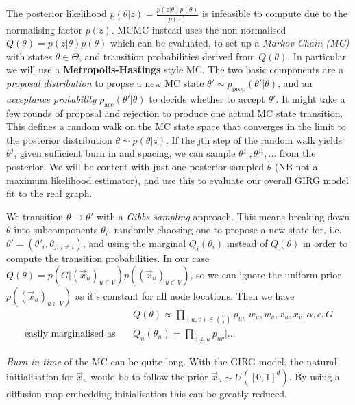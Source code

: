 The posterior likelihood $p(\theta | z) = \frac{p(z | \theta) p(\theta)}{p(z)}$ is infeasible to compute due to the normalising factor $p(z)$. MCMC instead uses the non-normalised $Q(\theta) = p(z | \theta) p(\theta)$ which can be evaluated, to set up a \textit{Markov Chain (MC)} with states $\theta \in \Theta$, and transition probabilities derived from $Q(\theta)$.
In particular we will use a \textbf{Metropolis-Hastings} style MC. The two basic components are a \textit{proposal distribution} to propse a new MC state $\theta' \sim p_{\mathrm{prop}}(\theta' | \theta)$, and an \textit{acceptance probability} $p_{\mathrm{acc}}(\theta' | \theta)$ to decide whether to accept $\theta'$. It might take a few rounds of proposal and rejection to produce one actual MC state transition. This defines  a random walk on the MC state space that converges in the limit to the posterior distribution $\theta \sim p(\theta | z)$. If the jth step of the random walk yields $\theta^j$, given sufficient burn in and spacing, we can sample $\theta^{j_1}, \theta^{j_2}, ...$ from the posterior. We will be content with just one posterior sampled $\hat{\theta}$ (NB not a maximum likelihood estimator), and use this to evaluate our overall GIRG model fit to the real graph.

We transition $\theta \to \theta'$ with a \textit{Gibbs sampling} approach. This means breaking down $\theta$ into subcomponents $\theta_i$, randomly choosing one to propose a new state for, i.e. $\theta' = (\theta'_i, \theta_{j:j \neq i})$, and using the marginal $Q_i(\theta_i)$ instead of $Q(\theta)$ in order to compute the transition probabilities.
In our case $Q(\theta) = p(G | (\vec{x}_u)_{u \in V}) p((\vec{x}_u)_{u \in V})$, so we can ignore the uniform prior $p((\vec{x}_u)_{u \in V})$ as it's constant for all node locations. Then we have 
\begin{align}
  & Q(\theta) \propto \prod_{(u,v) \in {V \choose 2}} p_{uv} | w_u, w_v, x_u, x_v, \alpha, c, G
  \\
  \text{easily marginalised as} \quad & Q_u(\theta_u) = \prod_{v \neq u} p_{uv} | ...
\end{align}


\textit{Burn in time} of the MC can be quite long. With the GIRG model, the natural initialisation for $\vec{x}_u$ would be to follow the prior $\vec{x}_u \sim U([0, 1]^d)$. By using a diffusion map embedding initialisation this can be greatly reduced.

